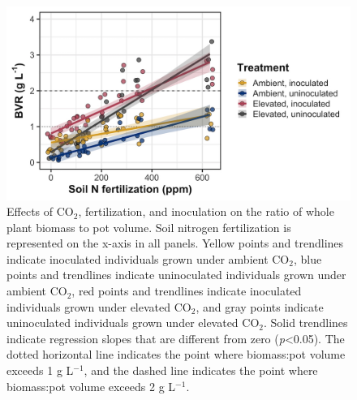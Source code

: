 \newpage
\begin{figure}
    \centering
    \includegraphics[width = \columnwidth]{ch5_NxCO2xI/figs/NxCO2xI_figS2_bvr.jpg}
    \caption[Effects of CO$_2$, fertilization, and inoculation on the ratio of whole plant biomass to pot volume]{Effects of CO$_2$, fertilization, and inoculation on the ratio of whole plant biomass to pot volume. Soil nitrogen fertilization is represented on the x-axis in all panels. Yellow points and trendlines indicate inoculated individuals grown under ambient CO$_2$, blue points and trendlines indicate uninoculated individuals grown under ambient CO$_2$, red points and trendlines indicate inoculated individuals grown under elevated CO$_2$, and gray points indicate uninoculated individuals grown under elevated CO$_2$. Solid trendlines indicate regression slopes that are different from zero (\textit{p}<0.05). The dotted horizontal line indicates the point where biomass:pot volume exceeds 1 g L$^{-1}$, and the dashed line indicates the point where biomass:pot volume exceeds 2 g L$^{-1}$.}
    \label{fig:figure.d2}
\end{figure}
\clearpage
